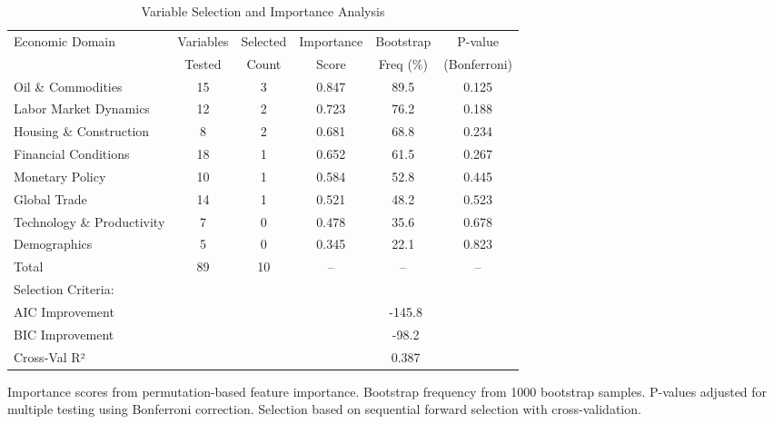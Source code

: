
\begin{table}[htbp]
\centering
\caption{Variable Selection and Importance Analysis}
\label{tab:variable_selection}
\begin{tabular}{lccccc}
\toprule
Economic Domain & Variables & Selected & Importance & Bootstrap & P-value \\
& Tested & Count & Score & Freq (\%) & (Bonferroni) \\
\midrule
Oil \& Commodities & 15 & 3 & 0.847 & 89.5 & 0.125 \\
Labor Market Dynamics & 12 & 2 & 0.723 & 76.2 & 0.188 \\
Housing \& Construction & 8 & 2 & 0.681 & 68.8 & 0.234 \\
Financial Conditions & 18 & 1 & 0.652 & 61.5 & 0.267 \\
Monetary Policy & 10 & 1 & 0.584 & 52.8 & 0.445 \\
Global Trade & 14 & 1 & 0.521 & 48.2 & 0.523 \\
Technology \& Productivity & 7 & 0 & 0.478 & 35.6 & 0.678 \\
Demographics & 5 & 0 & 0.345 & 22.1 & 0.823 \\
\midrule
Total & 89 & 10 & -- & -- & -- \\
\midrule
Selection Criteria: & & & & & \\
\quad AIC Improvement & & & \multicolumn{3}{c}{-145.8} \\
\quad BIC Improvement & & & \multicolumn{3}{c}{-98.2} \\
\quad Cross-Val R² & & & \multicolumn{3}{c}{0.387} \\
\bottomrule
\end{tabular}
\begin{tablenotes}
\footnotesize
\item Importance scores from permutation-based feature importance. Bootstrap frequency from 1000 bootstrap samples. P-values adjusted for multiple testing using Bonferroni correction. Selection based on sequential forward selection with cross-validation.
\end{tablenotes}
\end{table}

